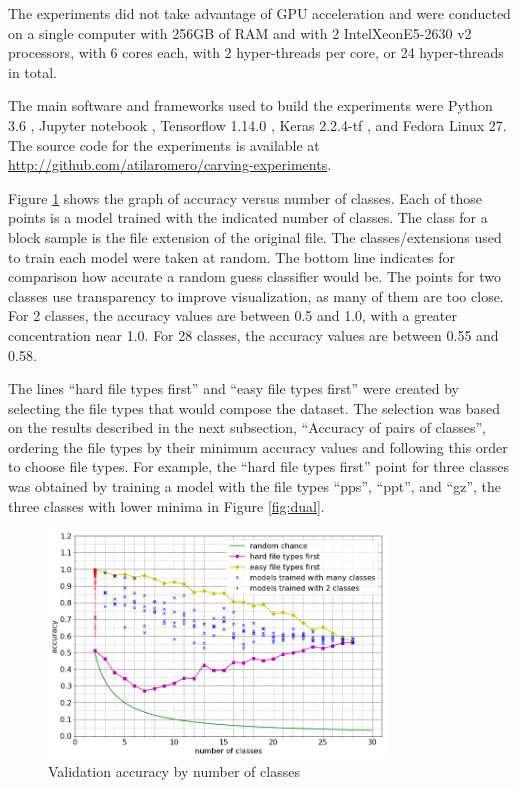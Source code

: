 The experiments did not take advantage of GPU acceleration and were  conducted on a single computer with 256GB of RAM and with 2 Intel\textregistered Xeon\textregistered E5-2630 v2 processors, with 6 cores each, with 2 hyper-threads per core, or 24 hyper-threads in total. 


The main software and frameworks used to build the experiments were Python 3.6 \cite{rossum_python_2019}, Jupyter notebook \cite{perez_jupyter_2019}, Tensorflow 1.14.0 \cite{google_brain_tensorflow_2019}, Keras 2.2.4-tf \cite{chollet_keras_2019}, and Fedora Linux 27.
The source code for the experiments is available at \sloppy\url{http://github.com/atilaromero/carving-experiments}.


Figure \ref{fig:nclasses} shows the graph of accuracy versus number of classes.  Each of those points is a model trained with the indicated number of classes. The class for a block sample is the file extension of the original file. The classes/extensions used to train each model were taken at random. The bottom line indicates for comparison how accurate a random guess classifier would be. The points for two classes use transparency to improve visualization, as many of them are too close. For 2 classes, the accuracy values are between 0.5 and 1.0, with a greater concentration near 1.0. For 28 classes, the accuracy values are between 0.55 and 0.58.

The lines ``hard file types first'' and ``easy file types first'' were created by selecting the file types that would compose the dataset. The selection was based on the results described in the next subsection, ``Accuracy of pairs of classes'', ordering the file types by their minimum accuracy values and following this order to choose file types. For example, the ``hard file types first'' point for three classes was obtained by training a model with the file types ``pps'', ``ppt'', and ``gz'', the three classes with lower minima in Figure \ref{fig:dual}.

\noindent
\begin{figure}[htb!]
\centering\includegraphics[width=0.8\textwidth]{content/nclasses.png}
\caption{\label{fig:nclasses}Validation accuracy by number of classes}%
\end{figure}

